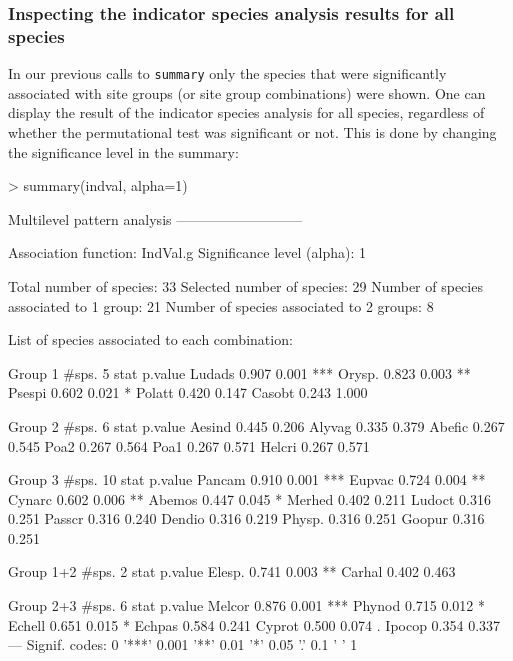 \documentclass[11pt,a4paper]{article}
\begin{document}
\subsubsection{Inspecting the indicator species analysis results for all species}
In our previous calls to \texttt{summary} only the species that were significantly associated with site groups (or site group combinations) were shown. One can display the result of the indicator species analysis for all species, regardless of whether the permutational test was significant or not. This is done by changing the significance level in the summary:
\begin{Schunk}
\begin{Sinput}
> summary(indval, alpha=1)
\end{Sinput}
\begin{Soutput}
 Multilevel pattern analysis
 ---------------------------

 Association function: IndVal.g
 Significance level (alpha): 1

 Total number of species: 33
 Selected number of species: 29 
 Number of species associated to 1 group: 21 
 Number of species associated to 2 groups: 8 

 List of species associated to each combination: 

 Group 1  #sps.  5 
        stat p.value    
Ludads 0.907   0.001 ***
Orysp. 0.823   0.003 ** 
Psespi 0.602   0.021 *  
Polatt 0.420   0.147    
Casobt 0.243   1.000    

 Group 2  #sps.  6 
        stat p.value
Aesind 0.445   0.206
Alyvag 0.335   0.379
Abefic 0.267   0.545
Poa2   0.267   0.564
Poa1   0.267   0.571
Helcri 0.267   0.571

 Group 3  #sps.  10 
        stat p.value    
Pancam 0.910   0.001 ***
Eupvac 0.724   0.004 ** 
Cynarc 0.602   0.006 ** 
Abemos 0.447   0.045 *  
Merhed 0.402   0.211    
Ludoct 0.316   0.251    
Passcr 0.316   0.240    
Dendio 0.316   0.219    
Physp. 0.316   0.251    
Goopur 0.316   0.251    

 Group 1+2  #sps.  2 
        stat p.value   
Elesp. 0.741   0.003 **
Carhal 0.402   0.463   

 Group 2+3  #sps.  6 
        stat p.value    
Melcor 0.876   0.001 ***
Phynod 0.715   0.012 *  
Echell 0.651   0.015 *  
Echpas 0.584   0.241    
Cyprot 0.500   0.074 .  
Ipocop 0.354   0.337    
---
Signif. codes:  0 '***' 0.001 '**' 0.01 '*' 0.05 '.' 0.1 ' ' 1 
\end{Soutput}
\end{Schunk}
\end{document}
